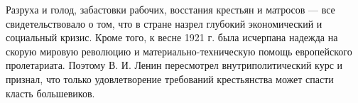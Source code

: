 \documentclass{article}
\begin{document}
\hfill

Разруха и голод, забастовки рабочих, восстания крестьян и матросов — все свидетельствовало о том, что в стране назрел глубокий экономический и социальный кризис. Кроме того, к весне 1921 г. была исчерпана надежда на скорую мировую революцию и материально-техническую помощь европейского пролетариата. Поэтому В. И. Ленин пересмотрел внутриполитический курс и признал, что только удовлетворение требований крестьянства может спасти класть большевиков.
\end{document}

